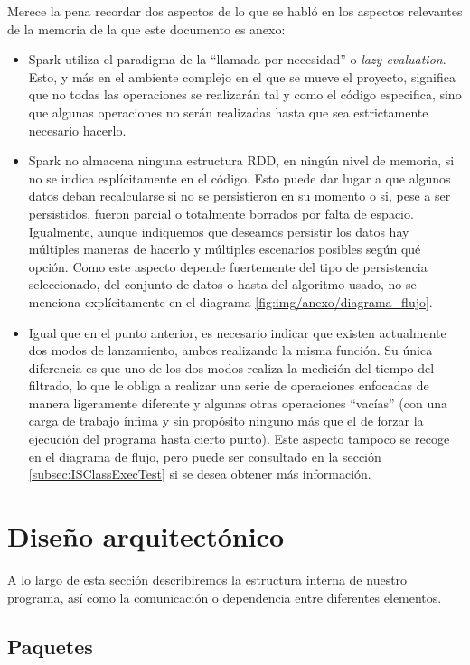 Merece la pena recordar dos aspectos de lo que se habló en los aspectos relevantes de la memoria de la que este documento es anexo:
\begin{itemize}
\item Spark utiliza el paradigma de la ``llamada por necesidad'' o \textit{lazy evaluation}. Esto, y más en el ambiente complejo en el que se mueve el proyecto, significa que no todas las operaciones se realizarán tal y como el código especifica, sino que algunas operaciones no serán realizadas hasta que sea estrictamente necesario hacerlo.
\item Spark no almacena ninguna estructura RDD, en ningún nivel de memoria, si no se indica esplícitamente en el código. Esto puede dar lugar a que algunos datos deban recalcularse si no se persistieron en su momento o si, pese a ser persistidos, fueron parcial o totalmente borrados por falta de espacio. Igualmente, aunque indiquemos que deseamos persistir los datos hay múltiples maneras de hacerlo y múltiples escenarios posibles según qué opción. Como este aspecto depende fuertemente del tipo de persistencia seleccionado, del conjunto de datos o hasta del algoritmo usado, no se menciona explícitamente en el diagrama \ref{fig:img/anexo/diagrama_flujo}.
\item Igual que en el punto anterior, es necesario indicar que existen actualmente dos modos de lanzamiento, ambos realizando la misma función. Su única diferencia es que uno de los dos modos realiza la medición del tiempo del filtrado, lo que le obliga a realizar una serie de operaciones enfocadas de manera ligeramente diferente y algunas otras operaciones ``vacías'' (con una carga de trabajo ínfima y sin propósito ninguno más que el de forzar la ejecución del programa hasta cierto punto). Este aspecto tampoco se recoge en el diagrama de flujo, pero puede ser consultado en la sección \ref{subsec:ISClassExecTest} si se desea obtener más información.
\end{itemize}

\section{Diseño arquitectónico}
A lo largo de esta sección describiremos la estructura interna de nuestro programa, así como la comunicación o dependencia entre diferentes elementos.

\subsection{Paquetes}

